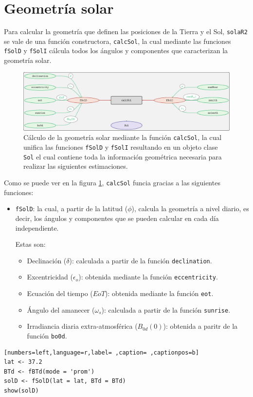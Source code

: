 \section{Geometría solar}
\label{sec:orgb67a7d0}
\label{sec:geometria-solar}
Para calcular la geometría que definen las posiciones de la Tierra y el Sol, \texttt{solaR2} se vale de una función constructora, \texttt{calcSol}, la cual mediante las funciones \texttt{fSolD} y \texttt{fSolI} cálcula todos los ángulos y componentes que caracterizan la geometría solar.
\begin{figure}[htbp]
\centering
\includegraphics[keepaspectratio,width=\textwidth,height=0.5\textheight]{figuras/calcSol.pdf}
\caption{Cálculo de la geometría solar mediante la función \texttt{calcSol}, la cual unifica las funciones \texttt{fSolD} y \texttt{fSolI} resultando en un objeto clase \texttt{Sol} el cual contiene toda la información geométrica necesaria para realizar las siguientes estimaciones. \label{fig:calcSol}}
\end{figure}

Como se puede ver en la figura \ref{fig:calcSol}, \texttt{calcSol} funcia gracias a las siguientes funciones:
\begin{itemize}
\item \texttt{fSolD}: la cual, a partir de la latitud (\(\phi\)), calcula la geometría a nivel diario, es decir, los ángulos y componentes que se pueden calcular en cada día independiente.

Estas son:
\begin{itemize}
\item Declinación (\(\delta\)): calculada a partir de la función \texttt{declination}.
\item Excentricidad (\(\epsilon_o\)): obtenida mediante la función \texttt{eccentricity}.
\item Ecuación del tiempo (\(EoT\)): obtenida mediante la función \texttt{eot}.
\item Ángulo del amanecer (\(\omega_s\)): calculada a partir de la función \texttt{sunrise}.
\item Irradiancia diaria extra-atmosférica (\(B_{0d}(0)\)): obtenida a paritr de la función \texttt{bo0d}.
\end{itemize}
\end{itemize}
\begin{lstlisting}[numbers=left,language=r,label= ,caption= ,captionpos=b]
lat <- 37.2
BTd <- fBTd(mode = 'prom')
solD <- fSolD(lat = lat, BTd = BTd)
show(solD)
\end{lstlisting}

